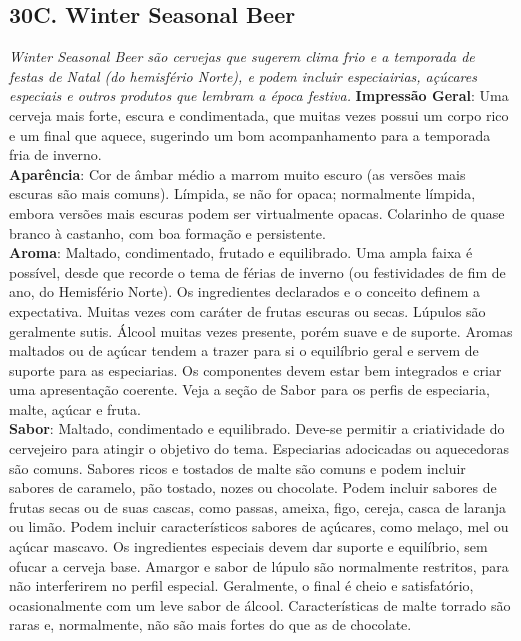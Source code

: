 \subsection*{30C. Winter Seasonal Beer}
\textit{Winter Seasonal Beer são cervejas que sugerem clima frio e a temporada de festas de Natal (do hemisfério Norte), e podem incluir especiairias, açúcares especiais e outros produtos que lembram a época festiva.}
\textbf{Impressão Geral}: Uma cerveja mais forte, escura e condimentada, que muitas vezes possui um corpo rico e um final que aquece, sugerindo um bom acompanhamento para a temporada fria de inverno. \\
\textbf{Aparência}: Cor de âmbar médio a marrom muito escuro (as versões mais escuras são mais comuns). Límpida, se não for opaca; normalmente límpida, embora versões mais escuras podem ser virtualmente opacas. Colarinho de quase branco à castanho, com boa formação e persistente. \\
\textbf{Aroma}: Maltado, condimentado, frutado e equilibrado. Uma ampla faixa é possível, desde que recorde o tema de férias de inverno (ou festividades de fim de ano, do Hemisfério Norte). Os ingredientes declarados e o conceito definem a expectativa. Muitas vezes com caráter de frutas escuras ou secas. Lúpulos são geralmente sutis. Álcool muitas vezes presente, porém suave e de suporte. Aromas maltados ou de açúcar tendem a trazer para si o equilíbrio geral e servem de suporte para as especiarias. Os componentes devem estar bem integrados e criar uma apresentação coerente. Veja a seção de Sabor para os perfis de especiaria, malte, açúcar e fruta. \\
\textbf{Sabor}: Maltado, condimentado e equilibrado. Deve-se permitir a criatividade do cervejeiro para atingir o objetivo do tema. Especiarias adocicadas ou aquecedoras são comuns. Sabores ricos e tostados de malte são comuns e podem incluir sabores de caramelo, pão tostado, nozes ou chocolate. Podem incluir sabores de frutas secas ou de suas cascas, como passas, ameixa, figo, cereja, casca de laranja ou limão. Podem incluir característicos sabores de açúcares, como melaço, mel ou açúcar mascavo. Os ingredientes especiais devem dar suporte e equilíbrio, sem ofucar a cerveja base. Amargor e sabor de lúpulo são normalmente restritos, para não interferirem no perfil especial. Geralmente, o final é cheio e satisfatório, ocasionalmente com um leve sabor de álcool. Características de malte torrado são raras e, normalmente, não são mais fortes do que as de chocolate. \\
